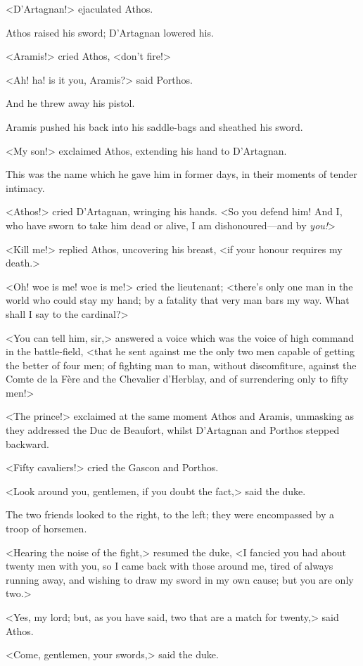 <D'Artagnan!> ejaculated Athos.

Athos raised his sword; D'Artagnan lowered his.

<Aramis!> cried Athos, <don't fire!>

<Ah! ha! is it you, Aramis?> said Porthos.

And he threw away his pistol.

Aramis pushed his back into his saddle-bags and sheathed his sword.

<My son!> exclaimed Athos, extending his hand to D'Artagnan.

This was the name which he gave him in former days, in their moments of tender intimacy.

<Athos!> cried D'Artagnan, wringing his hands. <So you defend him! And I, who have sworn to take him dead or alive, I am dishonoured—and by \textit{you!}>

<Kill me!> replied Athos, uncovering his breast, <if your honour requires my death.>

<Oh! woe is me! woe is me!> cried the lieutenant; <there's only one man in the world who could stay my hand; by a fatality that very man bars my way. What shall I say to the cardinal?>

<You can tell him, sir,> answered a voice which was the voice of high command in the battle-field, <that he sent against me the only two men capable of getting the better of four men; of fighting man to man, without discomfiture, against the Comte de la Fère and the Chevalier d'Herblay, and of surrendering only to fifty men!>

<The prince!> exclaimed at the same moment Athos and Aramis, unmasking as they addressed the Duc de Beaufort, whilst D'Artagnan and Porthos stepped backward.

<Fifty cavaliers!> cried the Gascon and Porthos.

<Look around you, gentlemen, if you doubt the fact,> said the duke.

The two friends looked to the right, to the left; they were encompassed by a troop of horsemen.

<Hearing the noise of the fight,> resumed the duke, <I fancied you had about twenty men with you, so I came back with those around me, tired of always running away, and wishing to draw my sword in my own cause; but you are only two.>

<Yes, my lord; but, as you have said, two that are a match for twenty,> said Athos.

<Come, gentlemen, your swords,> said the duke.

